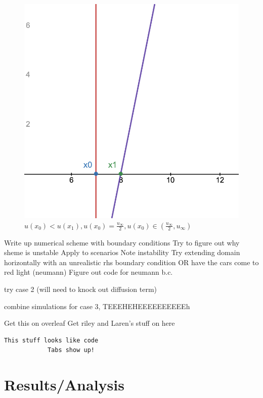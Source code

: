 \documentclass[12pt]{article}
\begin{document}
\begin{figure}[!htb]
    \caption{$u(x_0) > u(x_1), u(x_0), u(x_1) \in (\frac{u_\infty}{2}, u_\infty)$}\label{fig:no_shock_x1_x2_gt_half}
    \endminipage\hfill
    \includegraphics[width=\linewidth]{no_shock_x0_eq_half.png}
    \caption{$u(x_0) < u(x_1), u(x_0) = \frac{u_\infty}{2},  u(x_0) \in (\frac{u_\infty}{2}, u_\infty) $}\label{fig:no_shock_x0_eq_half}
    \endminipage
\end{figure}

Write up numerical scheme with boundary conditions
Try to figure out why sheme is unstable
Apply to scenarios
Note instability
Try extending domain horizontally with an unrealistic rhs boundary condition OR have the cars come to red light (neumann)
Figure out code for neumann b.c.

try case 2 (will need to knock out diffusion term)

combine simulations for case 3, TEEEHEHEEEEEEEEEEh

Get this on overleaf
Get riley and Laren's stuff  on here 

\begin{verbatim}
This stuff looks like code
            Tabs show up!
\end{verbatim}


\section{Results/Analysis}
\end{document}
